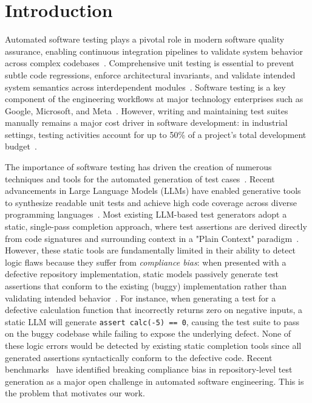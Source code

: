 \section{Introduction}
\label{sec:intro}

Automated software testing plays a pivotal role in modern software quality assurance, enabling continuous integration pipelines to validate system behavior across complex codebases~\cite{myers2011art, cse}. Comprehensive unit testing is essential to prevent subtle code regressions, enforce architectural invariants, and validate intended system semantics across interdependent modules~\cite{docprompting, repobench}. Software testing is a key component of the engineering workflows at major technology enterprises such as Google, Microsoft, and Meta~\cite{swebench}. However, writing and maintaining test suites manually remains a major cost driver in software development: in industrial settings, testing activities account for up to 50\% of a project's total development budget~\cite{myers2011art, bareiss2022code}.

The importance of software testing has driven the creation of numerous techniques and tools for the automated generation of test cases~\cite{evosuite, randoop, schafer2023empirical}. Recent advancements in Large Language Models (LLMs) have enabled generative tools to synthesize readable unit tests and achieve high code coverage across diverse programming languages~\cite{bareiss2022code, lemieux2023codamosa, xie2023chatunitest}. Most existing LLM-based test generators adopt a static, single-pass completion approach, where test assertions are derived directly from code signatures and surrounding context in a "Plain Context" paradigm~\cite{testexplora}. However, these static tools are fundamentally limited in their ability to detect logic flaws because they suffer from \textit{compliance bias}: when presented with a defective repository implementation, static models passively generate test assertions that conform to the existing (buggy) implementation rather than validating intended behavior~\cite{testexplora, sweagent}. For instance, when generating a test for a defective calculation function that incorrectly returns zero on negative inputs, a static LLM will generate \texttt{assert calc(-5) == 0}, causing the test suite to pass on the buggy codebase while failing to expose the underlying defect. None of these logic errors would be detected by existing static completion tools since all generated assertions syntactically conform to the defective code. Recent benchmarks~\cite{testexplora} have identified breaking compliance bias in repository-level test generation as a major open challenge in automated software engineering. This is the problem that motivates our work.

